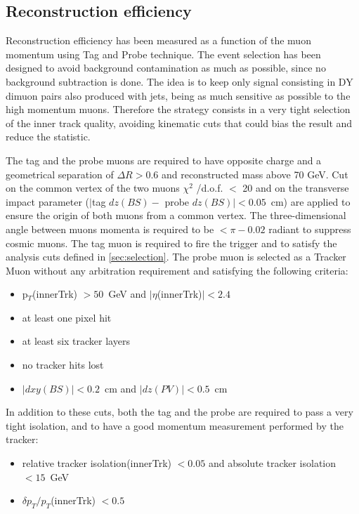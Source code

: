 \subsection{Reconstruction efficiency}
Reconstruction efficiency has been measured as a function of the muon momentum using Tag and Probe technique. The event selection has been designed to avoid background contamination as much as possible, since no background subtraction is done. The idea is to keep only signal consisting in DY dimuon pairs also produced with jets, being as much sensitive as possible to the high momentum muons. Therefore the strategy consists in a very tight selection of the inner track quality, avoiding kinematic cuts that could bias the result and reduce the statistic. 

The tag and the probe muons are required to have opposite charge and a geometrical separation of $\Delta R>0.6$ and reconstructed mass above 70 GeV. Cut on the common vertex of the two muons $\chi^2$ /d.o.f. $<$ 20 and on the transverse impact parameter ($|$tag $dz(BS)-$ probe $dz(BS)|<0.05$~cm) are applied to ensure the origin of both muons from a common vertex. The three-dimensional angle between muons momenta is required to be $<\pi - 0.02$ radiant to suppress cosmic muons. The tag muon is required to fire the trigger and to satisfy the analysis cuts defined in \ref{sec:selection}. The probe muon is selected as a Tracker Muon without any arbitration requirement and satisfying the following criteria: 
\begin{itemize}
\item p$_T$(innerTrk) $>50$~GeV and $|\eta$(innerTrk)$|<2.4$ 
\item at least one pixel hit
\item at least six tracker layers
\item no tracker hits lost
\item $|dxy(BS)|<0.2$~cm and $|dz(PV)|<0.5$~cm 
\end{itemize}
In addition to these cuts, both the tag and the probe are required to pass a very tight isolation, and to have a good momentum measurement performed by the tracker:
\begin{itemize}
\item relative tracker isolation(innerTrk) $<0.05$ and absolute tracker isolation $<15$~GeV  
\item $\delta{p_T}/p_T$(innerTrk) $<0.5$ 
\end{itemize}
